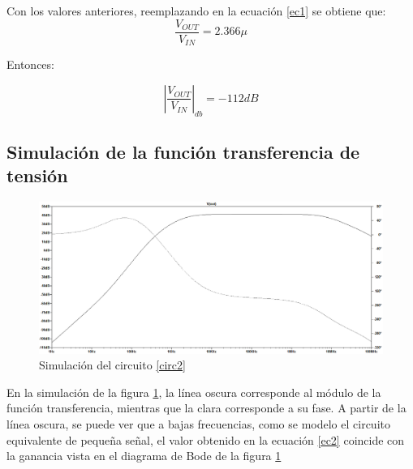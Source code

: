 Con los valores anteriores, reemplazando en la ecuaci\'on \ref{ec1} se obtiene que:
$$ \frac{V_{OUT}}{V_{IN}} = 2.366\mu $$

Entonces:

\begin{equation} |\frac{V_{OUT}}{V_{IN}} |_{db} = -112 dB \label{ec2} \end{equation}

\subsection*{\color{orange} Simulaci\'on de la funci\'on transferencia de tensi\'on}


\begin{figure}[H] %
\centering
\includegraphics[scale=0.45]{../EJ2/rtaenfrec}
\caption{Simulaci\'on del circuito \ref{circ2}}
\label{simEj2}
\end{figure}

En la simulaci\'on de la figura \ref{simEj2}, la l\'inea oscura corresponde al m\'odulo de la funci\'on transferencia, mientras que la clara corresponde a su fase. A partir de la l\'inea oscura, se puede ver que a bajas frecuencias, como se modelo el circuito equivalente de pequeña señal, el valor obtenido en la ecuaci\'on \ref{ec2} coincide con la ganancia vista en el diagrama de Bode de la figura \ref{simEj2}



















